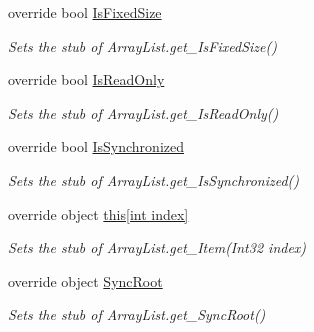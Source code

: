 \begin{DoxyCompactItemize}
override bool \hyperlink{class_system_1_1_collections_1_1_fakes_1_1_stub_array_list_a9dc3bf01925e7803d01859b148fae63c}{Is\-Fixed\-Size}
\begin{DoxyCompactList}\small\item\em Sets the stub of Array\-List.\-get\-\_\-\-Is\-Fixed\-Size()\end{DoxyCompactList}\item 
override bool \hyperlink{class_system_1_1_collections_1_1_fakes_1_1_stub_array_list_a059530ac21563087b9e793d30de5ba61}{Is\-Read\-Only}
\begin{DoxyCompactList}\small\item\em Sets the stub of Array\-List.\-get\-\_\-\-Is\-Read\-Only()\end{DoxyCompactList}\item 
override bool \hyperlink{class_system_1_1_collections_1_1_fakes_1_1_stub_array_list_a0d3cd7a13570d80222a6c7193d957cfe}{Is\-Synchronized}
\begin{DoxyCompactList}\small\item\em Sets the stub of Array\-List.\-get\-\_\-\-Is\-Synchronized()\end{DoxyCompactList}\item 
override object \hyperlink{class_system_1_1_collections_1_1_fakes_1_1_stub_array_list_ac7ac7e1b6c99115f1a2e29189322d2f0}{this\mbox{[}int index\mbox{]}}
\begin{DoxyCompactList}\small\item\em Sets the stub of Array\-List.\-get\-\_\-\-Item(\-Int32 index)\end{DoxyCompactList}\item 
override object \hyperlink{class_system_1_1_collections_1_1_fakes_1_1_stub_array_list_accbd3a916f314d4ad45dba7c97143064}{Sync\-Root}
\begin{DoxyCompactList}\small\item\em Sets the stub of Array\-List.\-get\-\_\-\-Sync\-Root()\end{DoxyCompactList}\end{DoxyCompactItemize}


